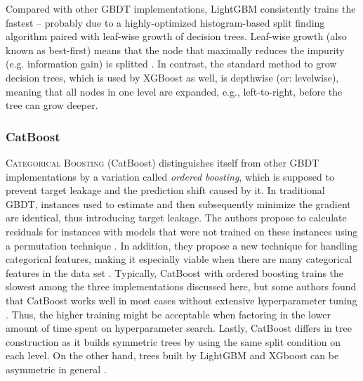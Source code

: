 Compared with other GBDT implementations, LightGBM consistently trains the fastest \parencite[1951--1954]{bentejac_comparative_2021} -- probably due to a highly-optimized histogram-based split finding algorithm paired with leaf-wise growth of decision trees. Leaf-wise growth (also known as best-first) means that the node that maximally reduces the impurity (e.g. information gain) is splitted \parencite[3]{shi_best-first_2007}. In contrast, the standard method to grow decision trees, which is used by XGBoost as well, is depthwise (or: levelwise), meaning that all nodes in one level are expanded, e.g., left-to-right, before the tree can grow deeper. 

\subsubsection{CatBoost}

\textsc{Categorical Boosting} (CatBoost) distinguishes itself from other GBDT implementations by a variation called \textit{ordered boosting}, which is supposed to prevent target leakage and the prediction shift caused by it. In traditional GBDT, instances used to estimate and then subsequently minimize the gradient are identical, thus introducing target leakage. The authors propose to calculate residuals for instances with models that were not trained on these instances using a permutation technique \parencites[5]{prokhorenkova_catboost_2017}[1943--1944]{bentejac_comparative_2021}. In addition, they propose a new technique for handling categorical features, making it especially viable when there are many categorical features in the data set \parencite[1]{prokhorenkova_catboost_2017}. Typically, CatBoost with ordered boosting trains the slowest among the three implementations discussed here, but some authors found that CatBoost works well in most cases without extensive hyperparameter tuning \parencite[26]{florek_benchmarking_2023}. Thus, the higher training might be acceptable when factoring in the lower amount of time spent on hyperparameter search. Lastly, CatBoost differs in tree construction as it builds symmetric trees by using the same split condition on each level. On the other hand, trees built by LightGBM and XGboost can be asymmetric in general \parencite[8]{florek_benchmarking_2023}.

